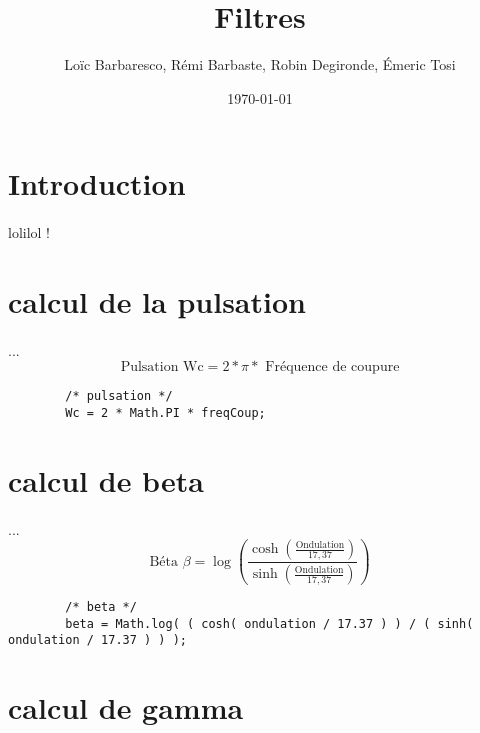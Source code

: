\documentclass[a4paper,11pt]{article}
\title{Filtres}
\author{Loïc Barbaresco, Rémi Barbaste, Robin Degironde, Émeric Tosi}
\date{\today}
\begin{document}
    \maketitle{}

    \setcounter{tocdepth}{1} %
    \renewcommand{\contentsname}{Sommaire} %
    \tableofcontents{} %
    \clearpage



\section{Introduction}
        \paragraph{}
lolilol !

\section{calcul de la pulsation}
    \paragraph{}
    ...\[ \mbox{Pulsation Wc} = 2 * \pi * \mbox{ Fréquence de coupure}\]
    \begin{lstlisting}
        /* pulsation */
        Wc = 2 * Math.PI * freqCoup;
    \end{lstlisting}

\section{calcul de beta}
    \paragraph{}
    ...\[ \mbox{Béta } \beta = \log( \frac{ \cosh( \frac{ \mbox{Ondulation} }{17,37} ) } { \sinh( \frac{ \mbox{Ondulation} }{17,37} ) } )\]
    \begin{lstlisting}
        /* beta */
        beta = Math.log( ( cosh( ondulation / 17.37 ) ) / ( sinh( ondulation / 17.37 ) ) );
    \end{lstlisting}

\section{calcul de gamma}
\end{document}

